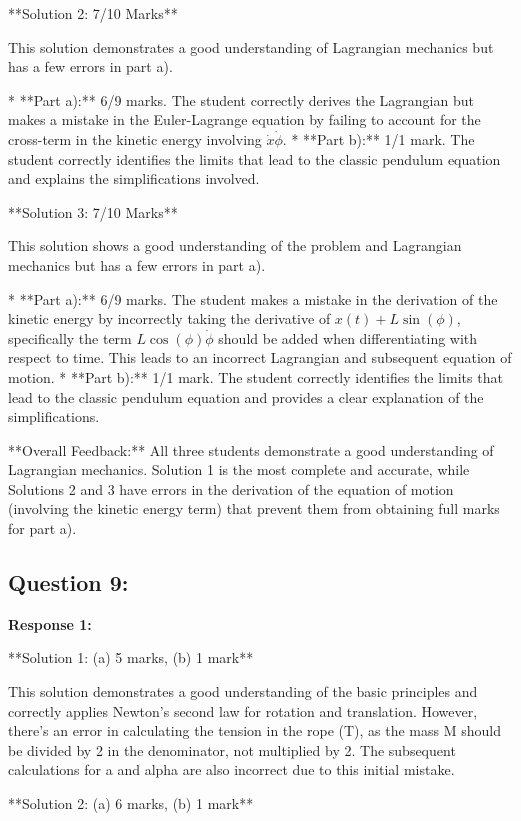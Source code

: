 \documentclass[a4paper,11pt]{article}
\begin{document}
**Solution 2: 7/10 Marks**

This solution demonstrates a good understanding of Lagrangian mechanics but has a few errors in part a).

*   **Part a):** 6/9 marks. The student correctly derives the Lagrangian but makes a mistake in the Euler-Lagrange equation by failing to account for the cross-term in the kinetic energy involving \( \dot{x}\dot{\phi} \).
*   **Part b):** 1/1 mark. The student correctly identifies the limits that lead to the classic pendulum equation and explains the simplifications involved.

**Solution 3: 7/10 Marks**

This solution shows a good understanding of the problem and Lagrangian mechanics but has a few errors in part a).

*   **Part a):** 6/9 marks. The student makes a mistake in the derivation of the kinetic energy by incorrectly taking the derivative of \(x(t) + L\sin(\phi)\), specifically the term \(L\cos(\phi)\dot{\phi}\) should be added when differentiating with respect to time. This leads to an incorrect Lagrangian and subsequent equation of motion.
*   **Part b):** 1/1 mark. The student correctly identifies the limits that lead to the classic pendulum equation and provides a clear explanation of the simplifications.

**Overall Feedback:** All three students demonstrate a good understanding of Lagrangian mechanics. Solution 1 is the most complete and accurate, while Solutions 2 and 3 have errors in the derivation of the equation of motion (involving the kinetic energy term) that prevent them from obtaining full marks for part a).

\subsection*{Question 9:}

\textbf{Response 1:}

**Solution 1: (a) 5 marks, (b) 1 mark**

This solution demonstrates a good understanding of the basic principles and correctly applies Newton's second law for rotation and translation. However, there's an error in calculating the tension in the rope (T), as the mass M should be divided by 2 in the denominator, not multiplied by 2. The subsequent calculations for a and alpha are also incorrect due to this initial mistake.

**Solution 2: (a) 6 marks, (b) 1 mark**
\end{document}
